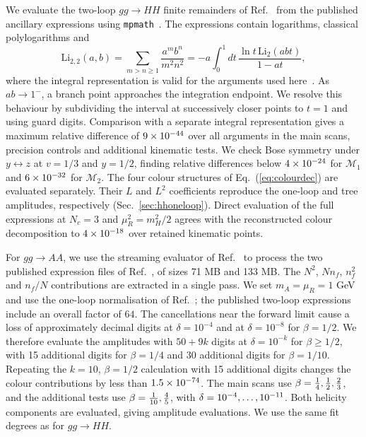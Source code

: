 \documentclass[%
 onecolumn,
 superscriptaddress,
 preprintnumbers,
 nofootinbib,
 amsmath,amssymb,
 aps,
 prl,
]{revtex4-2}
\newcommand{\M}{\mathcal M}
\begin{document}
We evaluate the two-loop $gg\to HH$ finite remainders
of Ref.~\cite{Banerjee:2018lfq} from the published
ancillary expressions using \texttt{mpmath}~\cite{mpmath}.
The expressions contain logarithms, classical
polylogarithms and
\begin{equation}
\mathrm{Li}_{2,2}(a,b)=\sum_{m>n\ge1}\frac{a^mb^n}{m^2n^2}
=-a\int_0^1dt\,\frac{\ln t\,\mathrm{Li}_2(abt)}{1-at},
\label{eq:li22}
\end{equation}
where the integral representation is valid for
the arguments used here~\cite{Frellesvig:2016ske}.
%
As $ab\to1^-$, a branch point approaches the
integration endpoint. We resolve this behaviour
by subdividing the interval at successively
closer points to $t=1$ and using
\hhLiGuard{} guard digits.
Comparison with a separate integral representation
gives a maximum relative difference of
$9\times10^{-44}$ over all arguments in the main
scans, precision controls and additional
kinematic tests.
%
We check Bose symmetry under $y\leftrightarrow z$
at $v=1/3$ and $y=1/2$, finding relative
differences below $4\times10^{-24}$ for $\M_1$
and $6\times10^{-32}$ for $\M_2$.
The four colour structures of
Eq.~(\ref{eq:colourdec}) are evaluated separately.
Their $L$ and $L^2$ coefficients reproduce
the one-loop and tree amplitudes, respectively
(Sec.~\ref{sec:hhoneloop}).
Direct evaluation of the full expressions at
$N_c=3$ and $\mu_R^2=m_H^2/2$ agrees with
the reconstructed colour decomposition to
$4\times10^{-18}$ over \storedCount{} retained
kinematic points.

For $gg\to AA$, we use the streaming evaluator
of Ref.~\cite{P1} to process the two published
expression files of Ref.~\cite{Bhattacharya:2019oun},
of sizes 71 MB and 133 MB.
The $N^2$, $Nn_f$, $n_f^2$ and $n_f/N$
contributions are extracted in a single pass.
We set $m_A=\mu_R=1$ GeV and use the
one-loop normalisation of Ref.~\cite{P1};
the published two-loop expressions include
an overall factor of $64$.
%
The cancellations near the forward limit
cause a loss of approximately \aaLossFour{}
decimal digits at $\delta=10^{-4}$
and \aaLossEight{} at $\delta=10^{-8}$
for $\beta=1/2$. We therefore evaluate
the amplitudes with $50+9k$ digits at
$\delta=10^{-k}$ for $\beta\ge1/2$,
with 15 additional digits for $\beta=1/4$
and 30 additional digits for $\beta=1/10$.
Repeating the $k=10$, $\beta=1/2$
calculation with 15 additional digits
changes the colour contributions by less
than $1.5\times10^{-74}$.
%
The main scans use $\beta=\frac14,\frac12,\frac23$,
and the additional tests use
$\beta=\frac{1}{10},\frac45$, with
$\delta=10^{-4},\ldots,10^{-11}$.
Both helicity components are evaluated,
giving \aaPointCount{} amplitude evaluations.
We use the same fit degrees as for $gg\to HH$.
\end{document}
